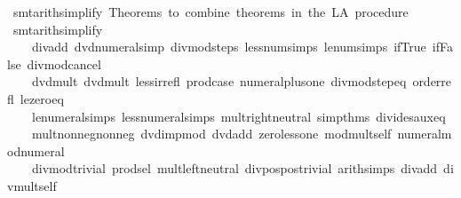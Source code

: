 \begin{isabellebody}
\isanewline
{}\isamarkupfalse%
\ smt{\isacharunderscore}{\kern0pt}arith{\isacharunderscore}{\kern0pt}simplify\ {\isacartoucheopen}Theorems\ to\ combine\ theorems\ in\ the\ LA\ procedure{\isacartoucheclose}\isanewline
\isanewline
{}\isamarkupfalse%
\ {\isacharbrackleft}{\kern0pt}smt{\isacharunderscore}{\kern0pt}arith{\isacharunderscore}{\kern0pt}simplify{\isacharbrackright}{\kern0pt}\ {\isacharequal}{\kern0pt}\isanewline
\ \ \ \ div{\isacharunderscore}{\kern0pt}add\ dvd{\isacharunderscore}{\kern0pt}numeral{\isacharunderscore}{\kern0pt}simp\ divmod{\isacharunderscore}{\kern0pt}steps\ less{\isacharunderscore}{\kern0pt}num{\isacharunderscore}{\kern0pt}simps\ le{\isacharunderscore}{\kern0pt}num{\isacharunderscore}{\kern0pt}simps\ if{\isacharunderscore}{\kern0pt}True\ if{\isacharunderscore}{\kern0pt}False\ divmod{\isacharunderscore}{\kern0pt}cancel\isanewline
\ \ \ \ dvd{\isacharunderscore}{\kern0pt}mult\ dvd{\isacharunderscore}{\kern0pt}mult{}\ less{\isacharunderscore}{\kern0pt}irrefl\ prod{\isachardot}{\kern0pt}case\ numeral{\isacharunderscore}{\kern0pt}plus{\isacharunderscore}{\kern0pt}one\ divmod{\isacharunderscore}{\kern0pt}step{\isacharunderscore}{\kern0pt}eq\ order{\isachardot}{\kern0pt}refl\ le{\isacharunderscore}{\kern0pt}zero{\isacharunderscore}{\kern0pt}eq\isanewline
\ \ \ \ le{\isacharunderscore}{\kern0pt}numeral{\isacharunderscore}{\kern0pt}simps\ less{\isacharunderscore}{\kern0pt}numeral{\isacharunderscore}{\kern0pt}simps\ mult{\isachardot}{\kern0pt}right{\isacharunderscore}{\kern0pt}neutral\ simp{\isacharunderscore}{\kern0pt}thms\ divides{\isacharunderscore}{\kern0pt}aux{\isacharunderscore}{\kern0pt}eq\isanewline
\ \ \ \ mult{\isacharunderscore}{\kern0pt}nonneg{\isacharunderscore}{\kern0pt}nonneg\ dvd{\isacharunderscore}{\kern0pt}imp{\isacharunderscore}{\kern0pt}mod{\isacharunderscore}{\kern0pt}{}\ dvd{\isacharunderscore}{\kern0pt}add\ zero{\isacharunderscore}{\kern0pt}less{\isacharunderscore}{\kern0pt}one\ mod{\isacharunderscore}{\kern0pt}mult{\isacharunderscore}{\kern0pt}self{}\ numeral{\isacharunderscore}{\kern0pt}mod{\isacharunderscore}{\kern0pt}numeral\isanewline
\ \ \ \ divmod{\isacharunderscore}{\kern0pt}trivial\ prod{\isachardot}{\kern0pt}sel\ mult{\isachardot}{\kern0pt}left{\isacharunderscore}{\kern0pt}neutral\ div{\isacharunderscore}{\kern0pt}pos{\isacharunderscore}{\kern0pt}pos{\isacharunderscore}{\kern0pt}trivial\ arith{\isacharunderscore}{\kern0pt}simps\ div{\isacharunderscore}{\kern0pt}add\ div{\isacharunderscore}{\kern0pt}mult{\isacharunderscore}{\kern0pt}self{}\isanewline

\end{isabellebody}
